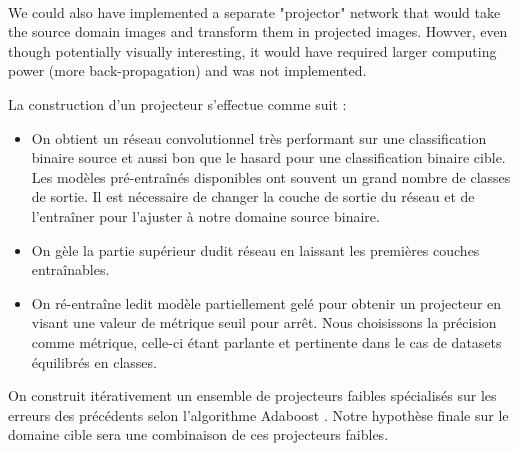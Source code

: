 \documentclass[11 pt]{article}
\begin{document}
\paragraph{} We could also have implemented a separate "projector" network that would take the source domain images and transform them in projected images. Howver, even though potentially visually interesting, it would have required larger computing power (more back-propagation) and was not implemented.

\pagebreak

\begin{samepage}
La construction d'un projecteur s'effectue comme suit : \medskip
  \begin{itemize}
    \item On obtient un réseau convolutionnel très performant sur une classification binaire source et aussi bon que le hasard pour une classification binaire cible. Les modèles pré-entraînés disponibles ont souvent un grand nombre de classes de sortie. Il est nécessaire de changer la couche de sortie du réseau et de l’entraîner pour l’ajuster à notre domaine source binaire.
    \nopagebreak
    \item On gèle la partie supérieur dudit réseau en laissant les premières couches entraînables.
    \nopagebreak
    \item On ré-entraîne ledit modèle partiellement gelé pour obtenir un projecteur en visant une valeur de métrique seuil pour arrêt. Nous choisissons la précision comme métrique, celle-ci étant parlante et pertinente dans le cas de datasets équilibrés en classes.
  \end{itemize}
\end{samepage}

On construit itérativement un ensemble de projecteurs faibles spécialisés sur les erreurs des précédents selon l'algorithme Adaboost \cite{boosting}. Notre hypothèse finale sur le domaine cible sera une combinaison de ces projecteurs faibles.
\end{document}
